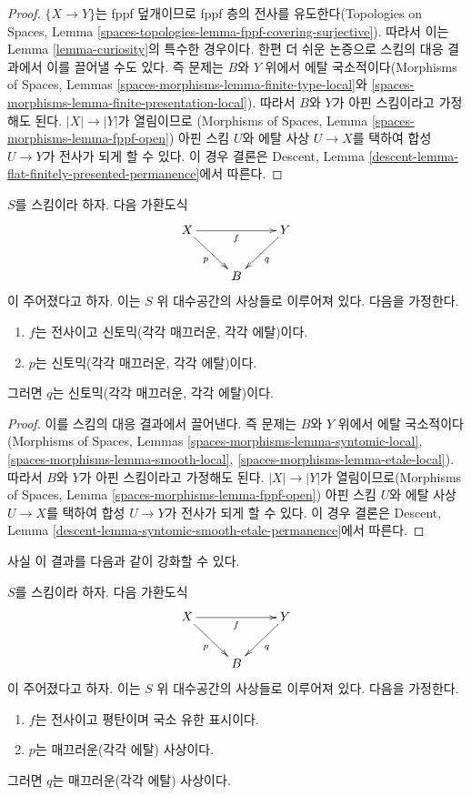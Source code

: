 \begin{proof}
$\{X\to Y\}$는 fppf 덮개이므로 fppf 층의 전사를 유도한다(Topologies
on Spaces, Lemma \ref{spaces-topologies-lemma-fppf-covering-surjective}).
따라서 이는 Lemma \ref{lemma-curiosity}의 특수한 경우이다. 한편 더 쉬운
논증으로 스킴의 대응 결과에서 이를 끌어낼 수도 있다. 즉 문제는 $B$와
$Y$ 위에서 에탈 국소적이다(Morphisms of Spaces, Lemmas
\ref{spaces-morphisms-lemma-finite-type-local}와
\ref{spaces-morphisms-lemma-finite-presentation-local}). 따라서 $B$와
$Y$가 아핀 스킴이라고 가정해도 된다. $|X|\to|Y|$가 열림이므로
(Morphisms of Spaces, Lemma \ref{spaces-morphisms-lemma-fppf-open}) 아핀
스킴 $U$와 에탈 사상 $U\to X$를 택하여 합성 $U\to Y$가 전사가 되게
할 수 있다. 이 경우 결론은 Descent, Lemma
\ref{descent-lemma-flat-finitely-presented-permanence}에서 따른다.
\end{proof}

\begin{lemma}
\label{lemma-syntomic-smooth-etale-permanence}
$S$를 스킴이라 하자. 다음 가환도식
$$
\xymatrix{
X \ar[rr]_f \ar[rd]_p & &
Y \ar[dl]^q \\
& B
}
$$
이 주어졌다고 하자. 이는 $S$ 위 대수공간의 사상들로 이루어져 있다.
다음을 가정한다.
\begin{enumerate}
\item $f$는 전사이고 신토믹(각각 매끄러운, 각각 에탈)이다.
\item $p$는 신토믹(각각 매끄러운, 각각 에탈)이다.
\end{enumerate}
그러면 $q$는 신토믹(각각 매끄러운, 각각 에탈)이다.
\end{lemma}

\begin{proof}
이를 스킴의 대응 결과에서 끌어낸다. 즉 문제는 $B$와 $Y$ 위에서 에탈
국소적이다(Morphisms of Spaces, Lemmas
\ref{spaces-morphisms-lemma-syntomic-local},
\ref{spaces-morphisms-lemma-smooth-local},
\ref{spaces-morphisms-lemma-etale-local}). 따라서 $B$와 $Y$가 아핀
스킴이라고 가정해도 된다. $|X|\to|Y|$가 열림이므로(Morphisms of
Spaces, Lemma \ref{spaces-morphisms-lemma-fppf-open}) 아핀 스킴 $U$와
에탈 사상 $U\to X$를 택하여 합성 $U\to Y$가 전사가 되게 할 수 있다.
이 경우 결론은 Descent, Lemma
\ref{descent-lemma-syntomic-smooth-etale-permanence}에서 따른다.
\end{proof}

\noindent
사실 이 결과를 다음과 같이 강화할 수 있다.

\begin{lemma}
\label{lemma-smooth-permanence}
$S$를 스킴이라 하자. 다음 가환도식
$$
\xymatrix{
X \ar[rr]_f \ar[rd]_p & &
Y \ar[dl]^q \\
& B
}
$$
이 주어졌다고 하자. 이는 $S$ 위 대수공간의 사상들로 이루어져 있다.
다음을 가정한다.
\begin{enumerate}
\item $f$는 전사이고 평탄이며 국소 유한 표시이다.
\item $p$는 매끄러운(각각 에탈) 사상이다.
\end{enumerate}
그러면 $q$는 매끄러운(각각 에탈) 사상이다.
\end{lemma}

